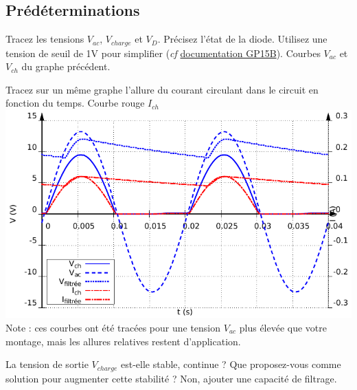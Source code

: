 \documentclass{../template/labo}
\begin{document}
\subsection{Prédéterminations}
\begin{predet}
\Question
{
	Tracez les tensions $V_{ac}$, $V_{charge}$ et $V_D$. Précisez l'état de la diode. Utilisez une tension de seuil de 1V pour simplifier (\textit{cf} \href{https://www.vishay.com/docs/88638/gp15a.pdf}{documentation GP15B}).%
}
{Courbes $V_{ac}$ et $V_{ch}$ du graphe précédent.}%
	\label{Q:7}

\Question
{
	Tracez sur un même graphe l'allure du courant circulant dans le circuit en fonction du temps.
}
{Courbe rouge $I_{ch}$\\
	\includegraphics[width=\linewidth]{mesures/simple_alternance.pdf}
	Note : ces courbes ont été tracées pour une tension $V_{ac}$ plus élevée que votre montage, mais les allures relatives restent d'application.}%
	\label{Q:8}

\Question
{
	La tension de sortie $V_{charge}$ est-elle stable, continue ? Que proposez-vous comme solution pour augmenter cette stabilité ?
}
{Non, ajouter une capacité de filtrage.}%
	\label{Q:9}
\end{predet}
\end{document}

